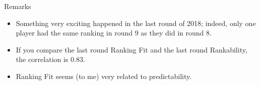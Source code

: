 \documentclass{beamer}
\begin{document}
\begin{frame}{Remarks}
\begin{itemize}
\item	Something very exciting happened in the last round of 2018; indeed, only one player had the same ranking in round 9 as they did in round 8.
\vfill
\item	If you compare the last round Ranking Fit and the last round Rankability, the correlation is $0.83$. 
\vfill
\item	Ranking Fit seems (to me) very related to predictability. 
\end{itemize}
\end{frame}
\end{document}
